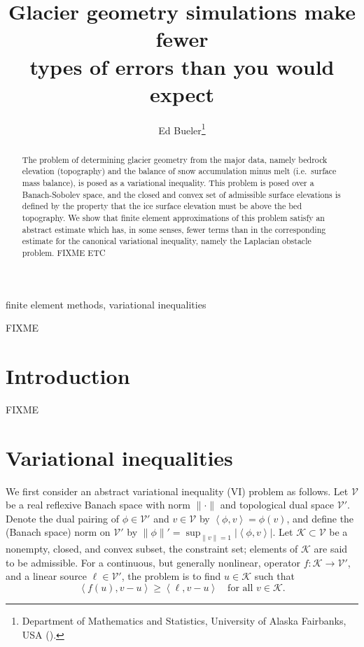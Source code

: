 \documentclass[hidelinks,onefignum,onetabnum,final]{siamart220329}  %
\title{Glacier geometry simulations make fewer \\ types of errors than you would expect}
\author{Ed Bueler\thanks{Department of Mathematics and Statistics, University of Alaska Fairbanks, USA
  (\email{elbueler@alaska.edu}).}}
\newcommand{\cK}{\mathcal{K}}
\newcommand{\cV}{\mathcal{V}}
\newcommand{\ip}[2]{\left<#1,#2\right>}
\begin{document}
\maketitle

\begin{abstract}
The problem of determining glacier geometry from the major data, namely bedrock elevation (topography) and the balance of snow accumulation minus melt (i.e.~surface mass balance), is posed as a variational inequality.  This problem is posed over a Banach-Sobolev space, and the closed and convex set of admissible surface elevations is defined by the property that the ice surface elevation must be above the bed topography.  We show that finite element approximations of this problem satisfy an abstract estimate which has, in some senses, fewer terms than in the corresponding estimate for the canonical variational inequality, namely the Laplacian obstacle problem.  FIXME ETC
\end{abstract}

\begin{keywords}
finite element methods, variational inequalities
\end{keywords}

\begin{MSCcodes}
FIXME
\end{MSCcodes}


\section{Introduction} \label{sec:intro}

FIXME


\section{Variational inequalities} \label{sec:vi}

We first consider an abstract variational inequality (VI) problem as follows.  Let $\cV$ be a real reflexive Banach space with norm $\|\cdot\|$ and topological dual space $\cV'$.  Denote the dual pairing of $\phi \in \cV'$ and $v\in\cV$ by $\ip{\phi}{v} = \phi(v)$, and define the (Banach space) norm on $\cV'$ by $\|\phi\|' = \sup_{\|v\|=1} |\!\ip{\phi}{v}\!|$.  Let $\cK \subset \cV$ be a nonempty, closed, and convex subset, the constraint set; elements of $\cK$ are said to be admissible.  For a continuous, but generally nonlinear, operator $f:\cK \to \cV'$, and a linear source $\ell\in \cV'$, the problem is to find $u\in \cK$ such that
\begin{equation}
\ip{f(u)}{v-u} \ge \ip{\ell}{v-u} \quad \text{for all } v\in \cK. \label{eq:vi}
\end{equation}
\end{document}

